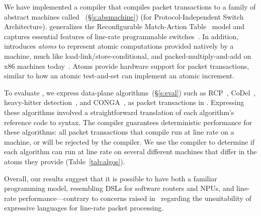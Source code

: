 We have implemented a \pktlanguage compiler that compiles packet transactions
to a family of abstract machines called \absmachine~(\S\ref{s:absmachine}) (for
Protocol-Independent Switch Architecture). \absmachine generalizes the
Reconfigurable Match-Action Table~\cite{rmt} model and captures essential
features of line-rate programmable switches~\cite{rmt, xpliant, flexpipe}. In
addition, \absmachine introduces {\em atoms} to represent atomic computations
provided natively by a \absmachine machine, much like
load-link/store-conditional, and packed-multiply-and-add on x86 machines
today~\cite{x86_manual}.  Atoms provide hardware support for packet
transactions, similar to how an atomic test-and-set can implement an atomic
increment.

To evaluate \pktlanguage, we express data-plane algorithms~(\S\ref{s:eval})
such as RCP~\cite{rcp}, CoDel~\cite{codel}, heavy-hitter
detection~\cite{opensketch}, and CONGA~\cite{conga}, as packet transactions in
\pktlanguage. Expressing these algorithms involved a straightforward
translation of each algorithm's reference code to \pktlanguage syntax.  The
\pktlanguage compiler guarantees deterministic performance for these
algorithms: all packet transactions that compile run at line rate on a
\absmachine machine, or will be rejected by the compiler.  We use the
\pktlanguage compiler to determine if each algorithm can run at line rate on
several different \absmachine machines that differ in the atoms they provide
(Table~\ref{tab:algos}).

Overall, our results suggest that it is possible to have both a familiar
programming model, resembling DSLs for software routers and NPUs, and line-rate
performance---contrary to concerns raised in~\cite{p4} regarding the
unsuitability of expressive languages for line-rate packet processing.
